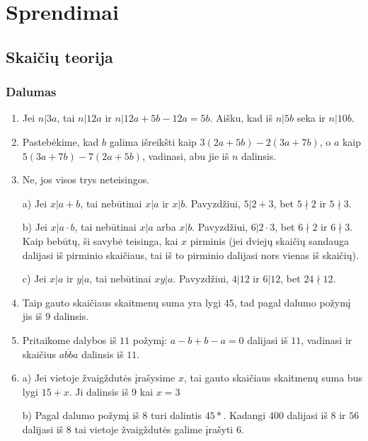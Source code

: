 \chapter{Sprendimai}
\section*{Skaičių teorija}
\subsection*{Dalumas}
\begin{enumerate} 
\item 
Jei $n|3a$, tai $n|12a$ ir $n|12a + 5b - 12a = 5b$. Aišku, kad iš
$n|5b$ seka ir $n|10b$.
\item 
Pastebėkime, kad $b$ galima išreikšti kaip $3(2a+5b) - 2(3a+7b)$, o
$a$ kaip $5(3a+7b) - 7(2a+5b)$, vadinasi, abu jie iš $n$ dalinsis.
\item 
Ne, jos visos trys neteisingos.

a) Jei $x|a+b$, tai nebūtinai $x|a$ ir $x|b$. Pavyzdžiui, $5|2+3$, bet
$5\nmid 2$ ir $5\nmid 3$.

b) Jei $x|a\cdot b$, tai nebūtinai $x|a$ arba $x|b$. Pavyzdžiui,
$6|2\cdot 3$, bet $6\nmid 2$ ir $6\nmid 3$. Kaip bebūtų, ši savybė
teisinga, kai $x$ pirminis (jei dviejų skaičių sandauga dalijasi iš
pirminio skaičiaus, tai iš to pirminio dalijasi nors vienas iš
skaičių).

c) Jei $x|a$ ir $y|a$, tai nebūtinai $xy|a$. Pavyzdžiui, $4|12$ ir
$6|12$, bet $24\nmid 12$.
\item 
Taip gauto skaičiaus skaitmenų suma yra lygi $45$, tad pagal dalumo
požymį jis iš $9$ dalinsis.
\item 
Pritaikome dalybos iš $11$ požymį: $a-b +b-a =0$ dalijasi iš
$11$, vadinasi ir skaičius $\overline{abba}$ dalinsis iš $11$.
\item 
a) Jei vietoje žvaigždutės įrašysime $x$, tai gauto skaičiaus
skaitmenų suma bus lygi $15+x$. Ji dalinsis iš $9$ kai $x=3$

b) Pagal dalumo požymį iš $8$ turi dalintis $45*$. Kadangi $400$
dalijasi iš $8$ ir $56$ dalijasi iš $8$ tai vietoje žvaigždutės galime
įrašyti $6$.


\end{enumerate}

